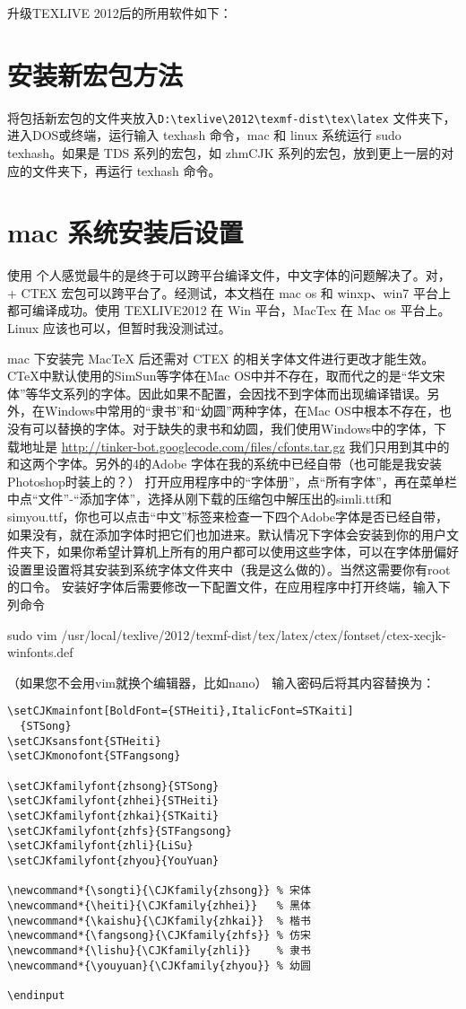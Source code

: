 升级TEXLIVE 2012后的所用软件如下：
\section{安装新宏包方法}
将包括新宏包的文件夹放入\verb|D:\texlive\2012\texmf-dist\tex\latex| 文件夹下，进入DOS或终端，运行输入 texhash 命令，mac 和 linux 系统运行 sudo texhash。如果是 TDS 系列的宏包，如 zhmCJK 系列的宏包，放到更上一层的对应的文件夹下，再运行 texhash 命令。
\section{mac 系统安装后设置}
 使用 \XeLaTeX 个人感觉最牛的是终于可以跨平台编译文件，中文字体的问题解决了。对，\XeLaTeX + CTEX 宏包可以跨平台了。经测试，本文档在 mac os 和 winxp、win7 平台上都可编译成功。使用 TEXLIVE2012 在 Win 平台，MacTex 在 Mac os 平台上。Linux 应该也可以，但暂时我没测试过。

mac 下安装完 MacTeX 后还需对 CTEX 的相关字体文件进行更改才能生效。CTeX中默认使用的SimSun等字体在Mac OS中并不存在，取而代之的是“华文宋体”等华文系列的字体。因此如果不配置，会因找不到字体而出现编译错误。另外，在Windows中常用的“隶书”和“幼圆”两种字体，在Mac OS中根本不存在，也没有可以替换的字体。对于缺失的隶书和幼圆，我们使用Windows中的字体，下载地址是
\uline{\url{http://tinker-bot.googlecode.com/files/cfonts.tar.gz}}
我们只用到其中的和这两个字体。另外的4的Adobe 字体在我的系统中已经自带（也可能是我安装Photoshop时装上的？）
打开应用程序中的“字体册”，点“所有字体”，再在菜单栏中点“文件”-“添加字体”，选择从刚下载的压缩包中解压出的simli.ttf和simyou.ttf，你也可以点击“中文”标签来检查一下四个Adobe字体是否已经自带，如果没有，就在添加字体时把它们也加进来。默认情况下字体会安装到你的用户文件夹下，如果你希望计算机上所有的用户都可以使用这些字体，可以在字体册偏好设置里设置将其安装到系统字体文件夹中（我是这么做的）。当然这需要你有root的口令。
安装好字体后需要修改一下配置文件，在应用程序中打开终端，输入下列命令
\begin{cmd}[label=修改MACTEX字体文件命令,xrightmargin=-0.5cm]
sudo vim /usr/local/texlive/2012/texmf-dist/tex/latex/ctex/fontset/ctex-xecjk-winfonts.def
\end{cmd}
（如果您不会用vim就换个编辑器，比如nano）
输入密码后将其内容替换为：

\begin{lstlisting}[language={[LaTeX]TeX}]
\setCJKmainfont[BoldFont={STHeiti},ItalicFont=STKaiti]
  {STSong}
\setCJKsansfont{STHeiti}
\setCJKmonofont{STFangsong}

\setCJKfamilyfont{zhsong}{STSong}
\setCJKfamilyfont{zhhei}{STHeiti}
\setCJKfamilyfont{zhkai}{STKaiti}
\setCJKfamilyfont{zhfs}{STFangsong}
\setCJKfamilyfont{zhli}{LiSu}
\setCJKfamilyfont{zhyou}{YouYuan}

\newcommand*{\songti}{\CJKfamily{zhsong}} % 宋体
\newcommand*{\heiti}{\CJKfamily{zhhei}}   % 黑体
\newcommand*{\kaishu}{\CJKfamily{zhkai}}  % 楷书
\newcommand*{\fangsong}{\CJKfamily{zhfs}} % 仿宋
\newcommand*{\lishu}{\CJKfamily{zhli}}    % 隶书
\newcommand*{\youyuan}{\CJKfamily{zhyou}} % 幼圆

\endinput
\end{lstlisting}

